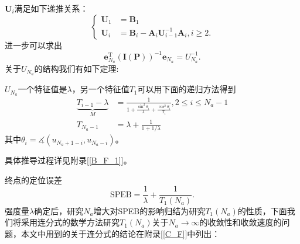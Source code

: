 $\bm{U}_i$满足如下递推关系：
\begin{equation}\label{eq:U_recursive_formula}
\begin{cases}
  \bm{U}_1 &= \bm{B}_1 \\
  \bm{U}_i &= \bm{B}_i-\bm{A}_i\bm{U}_{i-1}^{-1}\bm{A}_i,i\geq 2.
\end{cases}
\end{equation}
进一步可以求出
\begin{equation}\label{eq:thomas_final}
\bm{e}_{N_a}^{\textrm{T}}(\bm{I}(\bm{P}))^{-1}\bm{e}_{N_a}=U_{N_a}^{-1}.
\end{equation}
关于$U_{N_a}$的结构我们有如下定理:
\begin{theorem}
$U_{N_a}$一个特征值是$\lambda$，另一个特征值$T_1$可以用下面的递归方法得到
\begin{equation}\label{eq:recursive_efim}
\begin{split}
\underbrace{T_{i-1}-\lambda}_{M} & =\frac{1}{1+\frac{\sin^2\theta_i}{\lambda}+\frac{\cos^2\theta_i}{T_i}},2\leq i\leq N_a-1\\
T_{N_a-1} & = \lambda+\frac{1}{1+1/\lambda}
\end{split}
\end{equation}
其中$\theta_i=\measuredangle (u_{N_a +1-i},u_{N_a-i})$。
\end{theorem}
具体推导过程详见附录[\ref{B_F_1}]。
\begin{remark}
终点的定位误差
\begin{equation}\label{eq:final_speb}
\text{SPEB}=\frac{1}{\lambda}+\frac{1}{T_1(N_a)}.
\end{equation}
强度量$\lambda$确定后，研究$N_a$增大对SPEB的影响归结为研究$T_1(N_a)$的性质，下面我们将采用连分式的数学方法研究$T_1(N_a)$关于$N_a\to \infty$的收敛性和收敛速度的问题，本文中用到的关于连分式的结论在附录[\ref{C_F}]中列出\cite{ContinuedFraction}：
\end{remark}

